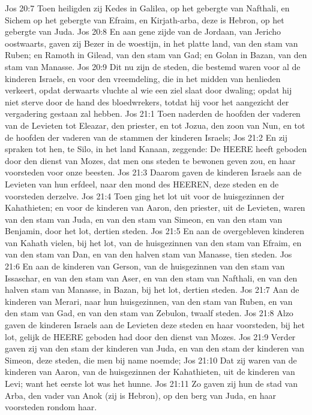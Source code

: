Jos 20:7  Toen heiligden zij Kedes in Galilea, op het gebergte van Nafthali, en Sichem op het gebergte van Efraim, en Kirjath-arba, deze is Hebron, op het gebergte van Juda.
Jos 20:8  En aan gene zijde van de Jordaan, van Jericho oostwaarts, gaven zij Bezer in de woestijn, in het platte land, van den stam van Ruben; en Ramoth in Gilead, van den stam van Gad; en Golan in Bazan, van den stam van Manasse.
Jos 20:9  Dit nu zijn de steden, die bestemd waren voor al de kinderen Israels, en voor den vreemdeling, die in het midden van henlieden verkeert, opdat derwaarts vluchte al wie een ziel slaat door dwaling; opdat hij niet sterve door de hand des bloedwrekers, totdat hij voor het aangezicht der vergadering gestaan zal hebben.
Jos 21:1  Toen naderden de hoofden der vaderen van de Levieten tot Eleazar, den priester, en tot Jozua, den zoon van Nun, en tot de hoofden der vaderen van de stammen der kinderen Israels;
Jos 21:2  En zij spraken tot hen, te Silo, in het land Kanaan, zeggende: De HEERE heeft geboden door den dienst van Mozes, dat men ons steden te bewonen geven zou, en haar voorsteden voor onze beesten.
Jos 21:3  Daarom gaven de kinderen Israels aan de Levieten van hun erfdeel, naar den mond des HEEREN, deze steden en de voorsteden derzelve.
Jos 21:4  Toen ging het lot uit voor de huisgezinnen der Kahathieten; en voor de kinderen van Aaron, den priester, uit de Levieten, waren van den stam van Juda, en van den stam van Simeon, en van den stam van Benjamin, door het lot, dertien steden.
Jos 21:5  En aan de overgebleven kinderen van Kahath vielen, bij het lot, van de huisgezinnen van den stam van Efraim, en van den stam van Dan, en van den halven stam van Manasse, tien steden.
Jos 21:6  En aan de kinderen van Gerson, van de huisgezinnen van den stam van Issaschar, en van den stam van Aser, en van den stam van Nafthali, en van den halven stam van Manasse, in Bazan, bij het lot, dertien steden.
Jos 21:7  Aan de kinderen van Merari, naar hun huisgezinnen, van den stam van Ruben, en van den stam van Gad, en van den stam van Zebulon, twaalf steden.
Jos 21:8  Alzo gaven de kinderen Israels aan de Levieten deze steden en haar voorsteden, bij het lot, gelijk de HEERE geboden had door den dienst van Mozes.
Jos 21:9  Verder gaven zij van den stam der kinderen van Juda, en van den stam der kinderen van Simeon, deze steden, die men bij name noemde;
Jos 21:10  Dat zij waren van de kinderen van Aaron, van de huisgezinnen der Kahathieten, uit de kinderen van Levi; want het eerste lot was het hunne.
Jos 21:11  Zo gaven zij hun de stad van Arba, den vader van Anok (zij is Hebron), op den berg van Juda, en haar voorsteden rondom haar.
